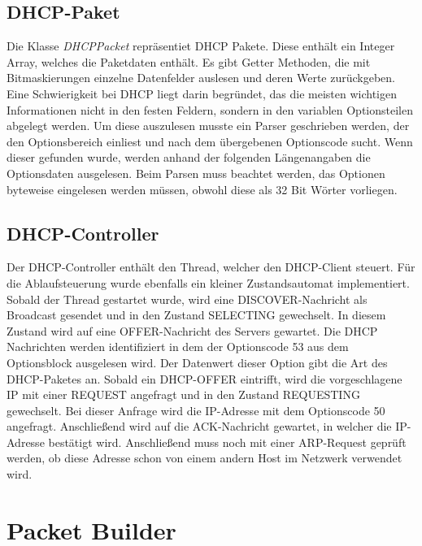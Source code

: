\subsection{DHCP-Paket}
Die Klasse \textit{DHCPPacket} repräsentiet DHCP Pakete. Diese enthält ein Integer Array, welches die Paketdaten enthält. Es gibt Getter Methoden, die mit Bitmaskierungen einzelne Datenfelder auslesen und deren Werte zurückgeben. Eine Schwierigkeit bei DHCP liegt darin begründet, das die meisten wichtigen Informationen nicht in den festen Feldern, sondern in den variablen Optionsteilen abgelegt werden. Um diese auszulesen musste ein Parser geschrieben werden, der den Optionsbereich einliest und nach dem übergebenen Optionscode sucht. Wenn dieser gefunden wurde, werden anhand der folgenden Längenangaben die Optionsdaten ausgelesen. Beim Parsen muss beachtet werden, das Optionen byteweise eingelesen werden müssen, obwohl diese als 32 Bit Wörter vorliegen. 

\subsection{DHCP-Controller}

Der DHCP-Controller enthält den Thread, welcher den DHCP-Client steuert. Für die Ablaufsteuerung wurde ebenfalls ein kleiner Zustandsautomat implementiert. Sobald der Thread gestartet wurde, wird eine DISCOVER-Nachricht als Broadcast gesendet und in den Zustand SELECTING gewechselt. In diesem Zustand wird auf eine OFFER-Nachricht des Servers gewartet. Die DHCP Nachrichten werden identifiziert in dem der Optionscode 53 aus dem Optionsblock ausgelesen wird. Der Datenwert dieser Option gibt die Art des DHCP-Paketes an. Sobald ein DHCP-OFFER eintrifft, wird die vorgeschlagene IP mit einer REQUEST angefragt und in den Zustand REQUESTING gewechselt. Bei dieser Anfrage wird die IP-Adresse mit dem Optionscode 50 angefragt. Anschließend wird auf die ACK-Nachricht gewartet, in welcher die IP-Adresse bestätigt wird. Anschließend muss noch mit einer ARP-Request geprüft werden, ob diese Adresse schon von einem andern Host im Netzwerk verwendet wird. 

\section{Packet Builder}

